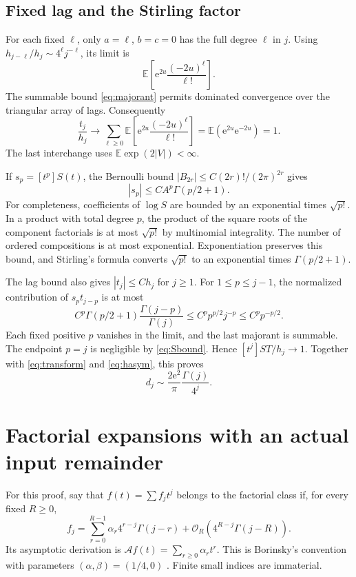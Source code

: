 \documentclass[11pt,letterpaper]{article}
\numberwithin{equation}{section}
\theoremstyle{remark}\newtheorem{remark}[theorem]{Remark}
\newcommand{\E}{\mathbb E}
\newcommand{\e}{\mathrm e}
\newcommand{\Ord}{\mathcal O}
\newcommand{\As}{\mathcal A}
\begin{document}
\subsection{Fixed lag and the Stirling factor}
For each fixed $\ell$, only $a=\ell$, $b=c=0$ has the full degree $\ell$ in $j$. Using $h_{j-\ell}/h_j\sim4^\ell j^{-\ell}$, its limit is
\[
 \E\left[\e^{2u}\frac{(-2u)^\ell}{\ell!}\right].
\]
The summable bound \eqref{eq:majorant} permits dominated convergence over the triangular array of lags. Consequently
\begin{equation}\label{eq:tlimit}
 \frac{t_j}{h_j}\longrightarrow
 \sum_{\ell\ge0}\E\left[\e^{2u}\frac{(-2u)^\ell}{\ell!}\right]
 =\E(\e^{2u}\e^{-2u})=1.
\end{equation}
The last interchange uses $\E\exp(2|V|)<\infty$.

If $s_p=[t^p]S(t)$, the Bernoulli bound
$|B_{2r}|\le C(2r)!/(2\pi)^{2r}$ gives
\begin{equation}\label{eq:Sbound}
 |s_p|\le C A^p\Gamma(p/2+1).
\end{equation}
For completeness, coefficients of $\log S$ are bounded by an exponential times $\sqrt{p!}$. In a product with total degree $p$, the product of the square roots of the component factorials is at most $\sqrt{p!}$ by multinomial integrality. The number of ordered compositions is at most exponential. Exponentiation preserves this bound, and Stirling's formula converts $\sqrt{p!}$ to an exponential times $\Gamma(p/2+1)$.

The lag bound also gives $|t_j|\le C h_j$ for $j\ge1$. For $1\le p\le j-1$, the normalized contribution of $s_pt_{j-p}$ is at most
\[
 C^p\Gamma(p/2+1)\frac{\Gamma(j-p)}{\Gamma(j)}
 \le C^p p^{p/2}j^{-p}\le C^p p^{-p/2}.
\]
Each fixed positive $p$ vanishes in the limit, and the last majorant is summable. The endpoint $p=j$ is negligible by \eqref{eq:Sbound}. Hence $[t^j]ST/h_j\to1$. Together with \eqref{eq:transform} and \eqref{eq:hasym}, this proves
\begin{equation}\label{eq:leading}
 d_j\sim\frac{2\e^2}{\pi}\frac{\Gamma(j)}{4^j}.
\end{equation}

\section{Factorial expansions with an actual input remainder}
For this proof, say that $f(t)=\sum f_jt^j$ belongs to the factorial class if, for every fixed $R\ge0$,
\begin{equation}\label{eq:class}
 f_j=\sum_{r=0}^{R-1}\alpha_r4^{r-j}\Gamma(j-r)
           +\Ord_R(4^{R-j}\Gamma(j-R)).
\end{equation}
Its asymptotic derivation is $\As f(t)=\sum_{r\ge0}\alpha_rt^r$. This is Borinsky's convention with parameters $(\alpha,\beta)=(1/4,0)$ \cite{borinsky}. Finite small indices are immaterial.
\end{document}
